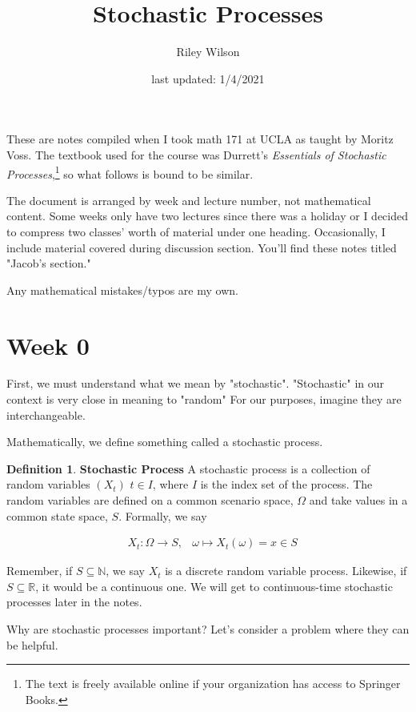 \documentclass[12pt]{article}
\theoremstyle{definition}
\newtheorem{definition}{Definition}[section]
\begin{document}
\title{Stochastic Processes}
\author{Riley Wilson}
\date{last updated: 1/4/2021}
\maketitle

These are notes compiled when I took math 171 at UCLA as taught by Moritz Voss. The textbook used for the course was Durrett's \textit{Essentials of Stochastic Processes},\footnote{The text is freely available online if your organization has access to Springer Books.} so what follows is bound to be similar.

The document is arranged by week and lecture number, not mathematical content. Some weeks only have two lectures since there was a holiday or I decided to compress two classes' worth of material under one heading. Occasionally, I include material covered during discussion section. You'll find these notes titled "Jacob's section."

Any mathematical mistakes/typos are my own.

\section{Week 0}

First, we must understand what we mean by "stochastic". "Stochastic" in our context is very close in meaning to "random" For our purposes, imagine they are interchangeable.

Mathematically, we define something called a stochastic process.

\begin{definition}{\textbf{Stochastic Process}}
  A stochastic process is a collection of random variables $(X_t)$ $t \in I$, where $I$ is the index set of the process. The random variables are defined on a common scenario space, $\Omega$ and take values in a common state space, $S$. Formally, we say

\begin{align*}
  &X_t: \Omega \rightarrow S,
  &\omega \mapsto X_t(\omega) = x \in S
\end{align*}

Remember, if $S \subseteq \mathbb{N}$, we say $X_t$ is a discrete random variable process. Likewise, if $S \subseteq \mathbb{R}$, it would be a continuous one. We will get to continuous-time stochastic processes later in the notes.
  \end{definition}

Why are stochastic processes important? Let's consider a problem where they can be helpful.
\end{document}
